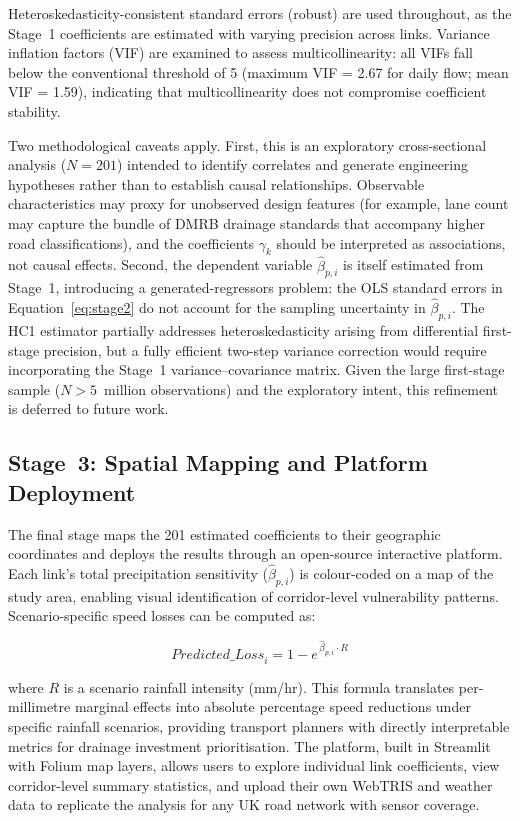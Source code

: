 \documentclass[review,authoryear]{elsarticle}
\begin{document}
Heteroskedasticity-consistent standard errors (robust) are used throughout, as the Stage~1 coefficients are estimated with varying precision across links. Variance inflation factors (VIF) are examined to assess multicollinearity: all VIFs fall below the conventional threshold of 5 (maximum VIF = 2.67 for daily flow; mean VIF = 1.59), indicating that multicollinearity does not compromise coefficient stability.

Two methodological caveats apply. First, this is an exploratory cross-sectional analysis ($N = 201$) intended to identify correlates and generate engineering hypotheses rather than to establish causal relationships. Observable characteristics may proxy for unobserved design features (for example, lane count may capture the bundle of DMRB drainage standards that accompany higher road classifications), and the coefficients $\gamma_k$ should be interpreted as associations, not causal effects. Second, the dependent variable $\hat{\beta}_{p,i}$ is itself estimated from Stage~1, introducing a generated-regressors problem: the OLS standard errors in Equation~\ref{eq:stage2} do not account for the sampling uncertainty in $\hat{\beta}_{p,i}$. The HC1 estimator partially addresses heteroskedasticity arising from differential first-stage precision, but a fully efficient two-step variance correction would require incorporating the Stage~1 variance--covariance matrix. Given the large first-stage sample ($N > 5$~million observations) and the exploratory intent, this refinement is deferred to future work.

\subsection{Stage~3: Spatial Mapping and Platform Deployment}
\label{sec:method:stage3}

The final stage maps the 201 estimated coefficients to their geographic coordinates and deploys the results through an open-source interactive platform. Each link's total precipitation sensitivity ($\hat{\beta}_{p,i}$) is colour-coded on a map of the study area, enabling visual identification of corridor-level vulnerability patterns. Scenario-specific speed losses can be computed as:

\begin{equation}
\label{eq:scenario}
\textit{Predicted\_Loss}_i = 1 - e^{\,\hat{\beta}_{p,i} \cdot R}
\end{equation}

\noindent where $R$ is a scenario rainfall intensity (\si{mm/hr}). This formula translates per-millimetre marginal effects into absolute percentage speed reductions under specific rainfall scenarios, providing transport planners with directly interpretable metrics for drainage investment prioritisation. The platform, built in Streamlit with Folium map layers, allows users to explore individual link coefficients, view corridor-level summary statistics, and upload their own WebTRIS and weather data to replicate the analysis for any UK road network with sensor coverage.
\end{document}
